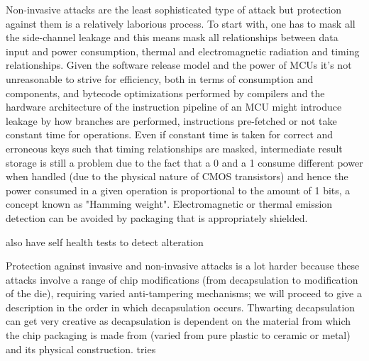 Non-invasive attacks are the least sophisticated type of attack but protection against them is a relatively laborious process\citep{anderson:cautionary_note}. To start with, one has to mask all the side-channel leakage and this means mask all relationships between data input and power consumption, thermal and electromagnetic radiation and timing relationships\citep{kocher:DPA}\cite{sergei:thesis}. Given the software release model and the power of MCUs it's not unreasonable to strive for efficiency, both in terms of consumption and components, and bytecode optimizations performed by compilers and the hardware architecture of the instruction pipeline of an MCU might introduce leakage \citep{kocher:DPA}\citep{sergei:thesis} by how branches are performed, instructions pre-fetched or not take constant time for operations. Even if constant time is taken for correct and erroneous keys such that timing relationships are masked, intermediate result storage is still a problem due to the fact that a 0 and a 1 consume different power when handled (due to the physical nature of CMOS transistors) and hence the power consumed in a given operation is proportional to the amount of 1 bits, a concept known as "Hamming weight"\citep{website:riscure}\citep{kocher:DPA}. Electromagnetic or thermal emission detection can be avoided by packaging that is appropriately shielded\citep{website:ibm_secure}\citep{kocher:DPA}. 

also have self health tests to detect alteration\citep{anderson:tamper_resistance}

Protection against invasive and non-invasive attacks is a lot harder because these attacks involve a range of chip modifications (from decapsulation to modification of the die), requiring varied anti-tampering mechanisms; we will proceed to give a description in the order in which decapsulation occurs. Thwarting decapsulation can get very creative as decapsulation is dependent on the material from which the chip packaging is made from (varied from pure plastic to ceramic or metal) and its physical construction. tries 

